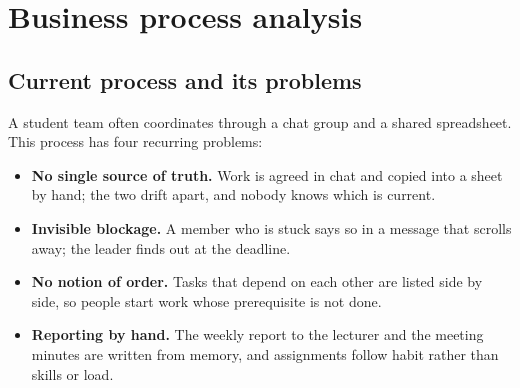\documentclass[../main.tex]{subfiles}
\begin{document}
\section{Business process analysis}
\subsection{Current process and its problems}
A student team often coordinates through a chat group and a shared spreadsheet. This
process has four recurring problems:
\begin{itemize}
  \item \textbf{No single source of truth.} Work is agreed in chat and copied into a sheet by hand;
        the two drift apart, and nobody knows which is current.
  \item \textbf{Invisible blockage.} A member who is stuck says so in a message that scrolls away;
        the leader finds out at the deadline.
  \item \textbf{No notion of order.} Tasks that depend on each other are listed side by side, so
        people start work whose prerequisite is not done.
  \item \textbf{Reporting by hand.} The weekly report to the lecturer and the meeting minutes are
        written from memory, and assignments follow habit rather than skills or load.
\end{itemize}
\end{document}
